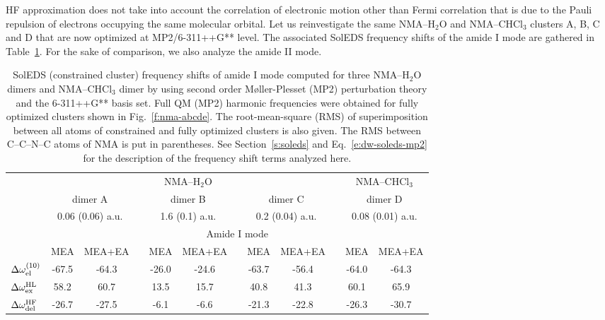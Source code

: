 \documentclass[a4paper,titlepage,twoside,fleqn,12pt]{book}
\begin{document}
\begin{refsection}
HF approximation does not take into account the correlation
of electronic motion other than Fermi correlation
that is due to the Pauli repulsion of electrons occupying the same
molecular orbital. Let us reinvestigate the same NMA--H$_2$O
and NMA--CHCl$_3$ clusters A, B, C and D that are now optimized
at MP2/6-311++G** level. The associated SolEDS frequency shifts
of the amide I mode are gathered in Table~\ref{t:mp2-soleds-amide-I}.
For the sake of comparison, we also analyze the amide II mode.
%
\begin{table}[t!]
\caption{
SolEDS (constrained cluster) frequency shifts of amide I mode computed for three NMA--H$_2$O dimers 
and NMA--CHCl$_3$ dimer by using second
order M{\o}ller-Plesset (MP2) perturbation theory and the 6-311++G** basis set. 
Full QM (MP2) harmonic
frequencies were obtained for fully optimized clusters shown in Fig.~\ref{f:nma-abcde}. 
The root\hyp{}mean\hyp{}square (RMS) of
superimposition between all atoms of constrained and fully optimized clusters is also given. The RMS between
C--C--N--C atoms of NMA is put in parentheses. See Section~\ref{s:soleds} and Eq.~\eqref{e:dw-soleds-mp2}
for the description of the frequency shift terms analyzed here.
\label{t:mp2-soleds-amide-I}}
\begin{tabular*}{1.0\textwidth}{@{\extracolsep{\fill} } l ccccccccccc }
\hline\hline
 & \multicolumn{8}{c}{NMA--H$_2$O} && \multicolumn{2}{c}{NMA--CHCl$_3$} \\
\cline{2-9}
\cline{11-12}
 & \multicolumn{2}{c}{dimer A} && 
    \multicolumn{2}{c}{dimer B} && 
    \multicolumn{2}{c}{dimer C} && 
    \multicolumn{2}{c}{dimer D} \\
 & \multicolumn{2}{c}{0.06 (0.06) a.u.} && 
    \multicolumn{2}{c}{1.6 (0.1) a.u.}   && 
    \multicolumn{2}{c}{0.2 (0.04) a.u.}  && 
    \multicolumn{2}{c}{0.08 (0.01) a.u.} \\
\cline{2-12}
 & \multicolumn{11}{c}{Amide I mode} \\
\cline{2-12}
 & MEA & MEA+EA &&  MEA & MEA+EA && MEA & MEA+EA && MEA & MEA+EA \\
\hline
 $\Delta \omega_{{\rm el}}^{(10)}$      & -67.5  & -64.3   && -26.0  & -24.6   && -63.7  & -56.4  && -64.0 & -64.3 \\
 $\Delta \omega_{{\rm ex}}^{\rm HL}$    &  58.2  &  60.7   &&  13.5  &  15.7   &&  40.8  &  41.3  &&  60.1 &  65.9 \\
 $\Delta \omega_{{\rm del}}^{\rm HF}$   & -26.7  & -27.5   &&  -6.1  &  -6.6   && -21.3  & -22.8  && -26.3 & -30.7 \\

\end{tabular*}
\end{table}
\end{refsection}
\end{document}
